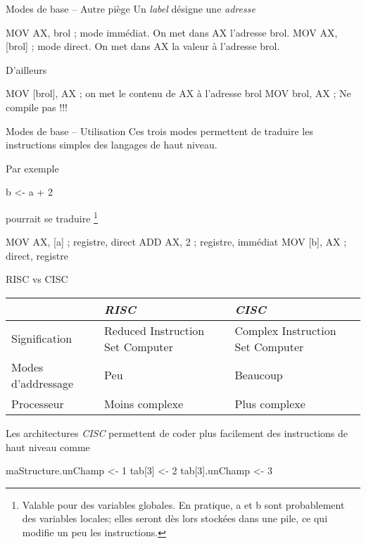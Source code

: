 \documentclass[14pt]{beamer}
\begin{document}
\begin{frame}[fragile]{Modes de base -- Autre piège}
Un \emph{label} désigne une \emph{adresse}
\begin{Asm}
	MOV AX, brol      ; mode immédiat. On met dans AX l'adresse brol.
	MOV AX, [brol]    ; mode direct. On met dans AX la valeur à l'adresse brol.
\end{Asm}
\bigskip
D'ailleurs
\begin{Asm}
	MOV [brol], AX    ; on met le contenu de AX à l'adresse brol
	MOV brol, AX      ; Ne compile pas !!!
\end{Asm}
\end{frame}

\begin{frame}[fragile]{Modes de base -- Utilisation}
Ces trois modes permettent de traduire les instructions simples
des langages de haut niveau.

\medskip
Par exemple
\begin{Code}
	b <- a + 2
\end{Code}
pourrait se traduire%
\footnote{
	\scriptsize{Valable pour des variables globales.
	En pratique, a et b sont probablement des variables locales;
	elles seront dès lors stockées dans une pile, ce qui modifie
	un peu les instructions.}
}
\begin{Asm}
	MOV AX, [a]   ; registre, direct
	ADD AX, 2     ; registre, immédiat
	MOV [b], AX   ; direct, registre
\end{Asm}
\end{frame}

\begin{frame}[fragile]{RISC vs CISC}

\begin{footnotesize}
\begin{tabular}{p{3cm}p{3cm}p{3cm}}
	& \emph{RISC} & \emph{CISC} \\\hline
Signification & Reduced Instruction Set Computer & Complex Instruction Set Computer \\\hline
Modes d'addressage & Peu & Beaucoup \\\hline
Processeur & Moins complexe & Plus complexe \\\hline
\end{tabular}
\end{footnotesize}

\bigskip
Les architectures \emph{CISC} permettent de coder plus facilement
des instructions de haut niveau comme
\begin{Code}
	maStructure.unChamp <- 1
	tab[3] <- 2
	tab[3].unChamp <- 3
\end{Code}
\end{frame}
\end{document}
